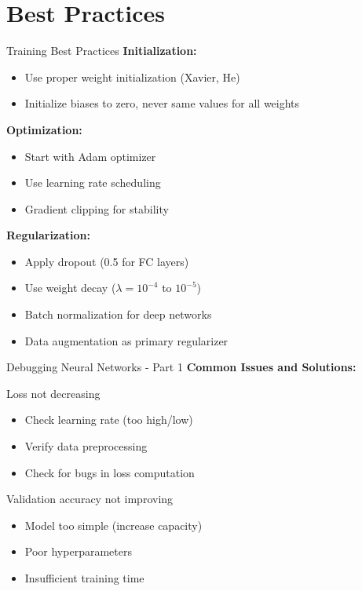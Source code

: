 \documentclass[aspectratio=169,10pt]{beamer}
\begin{document}
\section{Best Practices}

\begin{frame}{Training Best Practices}
\textbf{Initialization:}
\begin{itemize}
\item Use proper weight initialization (Xavier, He)
\item Initialize biases to zero, never same values for all weights
\end{itemize}

\textbf{Optimization:}
\begin{itemize}
\item Start with Adam optimizer
\item Use learning rate scheduling
\item Gradient clipping for stability
\end{itemize}

\textbf{Regularization:}
\begin{itemize}
\item Apply dropout (0.5 for FC layers)
\item Use weight decay ($\lambda = 10^{-4}$ to $10^{-5}$)
\item Batch normalization for deep networks
\item Data augmentation as primary regularizer
\end{itemize}
\end{frame}

\begin{frame}{Debugging Neural Networks - Part 1}
\textbf{Common Issues and Solutions:}

\begin{alertblock}{Loss not decreasing}
\begin{itemize}
\item Check learning rate (too high/low)
\item Verify data preprocessing
\item Check for bugs in loss computation
\end{itemize}
\end{alertblock}

\begin{alertblock}{Validation accuracy not improving}
\begin{itemize}
\item Model too simple (increase capacity)
\item Poor hyperparameters
\item Insufficient training time
\end{itemize}
\end{alertblock}
\end{frame}
\end{document}

